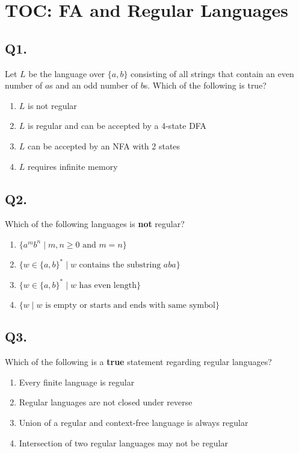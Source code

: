 \section{TOC: FA and Regular Languages}

\subsection*{Q1.}
Let $L$ be the language over $\{a, b\}$ consisting of all strings that contain an even number of $a$s and an odd number of $b$s. Which of the following is true?

\begin{enumerate}[label=(\alph*)]
    \item $L$ is not regular  
    \item $L$ is regular and can be accepted by a 4-state DFA  
    \item $L$ can be accepted by an NFA with 2 states  
    \item $L$ requires infinite memory  
\end{enumerate}

\vspace{1em}

\subsection*{Q2.}
Which of the following languages is \textbf{not} regular?

\begin{enumerate}[label=(\alph*)]
    \item $\{ a^m b^n \mid m,n \geq 0 \text{ and } m = n \}$  
    \item $\{ w \in \{a, b\}^* \mid w \text{ contains the substring } aba \}$  
    \item $\{ w \in \{a, b\}^* \mid w \text{ has even length} \}$  
    \item $\{ w \mid w \text{ is empty or starts and ends with same symbol} \}$  
\end{enumerate}

\vspace{1em}

\subsection*{Q3.}
Which of the following is a \textbf{true} statement regarding regular languages?

\begin{enumerate}[label=(\alph*)]
    \item Every finite language is regular  
    \item Regular languages are not closed under reverse  
    \item Union of a regular and context-free language is always regular  
    \item Intersection of two regular languages may not be regular  
\end{enumerate}

